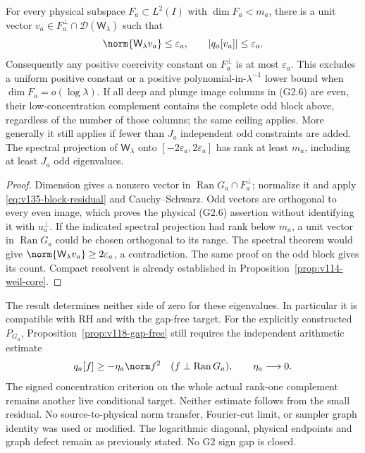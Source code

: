 \begin{corollary}
\label{cor:v135-coercivity-obstruction}
For every physical subspace $F_a\subset L^2(I)$ with
$\dim F_a<m_a$, there is a unit vector
$v_a\in F_a^\perp\cap\mathcal D(\mathsf W_\lambda)$ such that
\begin{equation}\label{eq:v135-complement-ceiling}
 \norm{\mathsf W_\lambda v_a}\le\varepsilon_a,
 \qquad |q_a[v_a]|\le\varepsilon_a.
\end{equation}
Consequently any positive coercivity constant on $F_a^\perp$ is
at most $\varepsilon_a$.  This excludes a uniform positive constant
or a positive polynomial-in-$\lambda^{-1}$ lower bound when
$\dim F_a=o(\log\lambda)$.
If all deep and plunge image columns in (G2.6) are even, their
low-concentration complement contains the complete odd block above,
regardless of the number of those columns; the same ceiling applies.
More generally it still applies if fewer than $J_a$ independent odd
constraints are added.
The spectral projection of $\mathsf W_\lambda$ onto
$[-2\varepsilon_a,2\varepsilon_a]$ has rank at least $m_a$,
including at least $J_a$ odd eigenvalues.
\end{corollary}
\begin{proof}
Dimension gives a nonzero vector in
$\operatorname{Ran}G_a\cap F_a^\perp$; normalize it and apply
\eqref{eq:v135-block-residual} and Cauchy--Schwarz.
Odd vectors are orthogonal to every even image, which proves the
physical (G2.6) assertion without identifying it with $u_a^\perp$.
If the indicated spectral projection had rank below $m_a$, a unit
vector in $\operatorname{Ran}G_a$ could be chosen orthogonal to its
range.  The spectral theorem would give
$\norm{\mathsf W_\lambda v_a}\ge2\varepsilon_a$, a contradiction.
The same proof on the odd block gives its count. Compact resolvent
is already established in Proposition~\ref{prop:v114-weil-core}.
\end{proof}

The result determines neither side of zero for these eigenvalues.
In particular it is compatible with RH and with the gap-free target.
For the explicitly constructed $P_{G_a}$,
Proposition~\ref{prop:v118-gap-free} still requires the independent
arithmetic estimate
\[
 q_a[f]\ge-\eta_a\norm f^2\quad
 (f\perp\operatorname{Ran}G_a),\qquad \eta_a\longrightarrow0.
\]
The signed concentration criterion on the whole actual rank-one
complement remains another live conditional target.  Neither estimate
follows from the small residual.  No source-to-physical norm transfer,
Fourier-cut limit, or sampler graph identity was used or modified.
The logarithmic diagonal, physical endpoints and graph defect remain
as previously stated.  No G2 sign gap is closed.

